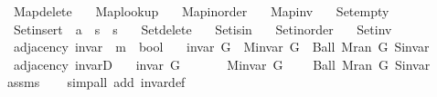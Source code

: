 \begin{isabellebody}
\ \ Map{\isacharunderscore}{\kern0pt}delete\ \isanewline
\ \ Map{\isacharunderscore}{\kern0pt}lookup\ \isanewline
\ \ Map{\isacharunderscore}{\kern0pt}inorder\ \isanewline
\ \ Map{\isacharunderscore}{\kern0pt}inv\ \isanewline
\ \ Set{\isacharunderscore}{\kern0pt}empty\ \isanewline
\ \ Set{\isacharunderscore}{\kern0pt}insert\ {\isacharcolon}{\kern0pt}{\isacharcolon}{\kern0pt}\ {\isachardoublequoteopen}{\isacharprime}{\kern0pt}a\ {\isasymRightarrow}\ {\isacharprime}{\kern0pt}s\ {\isasymRightarrow}\ {\isacharprime}{\kern0pt}s{\isachardoublequoteclose}\ \isanewline
\ \ Set{\isacharunderscore}{\kern0pt}delete\ \isanewline
\ \ Set{\isacharunderscore}{\kern0pt}isin\ \isanewline
\ \ Set{\isacharunderscore}{\kern0pt}inorder\ \isanewline
\ \ Set{\isacharunderscore}{\kern0pt}inv\isanewline
\isanewline
{}\isamarkupfalse%
\ {\isacharparenleft}{\kern0pt}\ adjacency{\isacharparenright}{\kern0pt}\ invar\ {\isacharcolon}{\kern0pt}{\isacharcolon}{\kern0pt}\ {\isachardoublequoteopen}{\isacharprime}{\kern0pt}m\ {\isasymRightarrow}\ bool{\isachardoublequoteclose}\ \isanewline
\ \ {\isachardoublequoteopen}invar\ G\ {\isasymequiv}\ M{\isachardot}{\kern0pt}invar\ G\ {\isasymand}\ Ball\ {\isacharparenleft}{\kern0pt}M{\isachardot}{\kern0pt}ran\ G{\isacharparenright}{\kern0pt}\ S{\isachardot}{\kern0pt}invar{\isachardoublequoteclose}\isanewline
%
\isadeliminvisible
\isanewline
%
\endisadeliminvisible
%
\isataginvisible
{}\isamarkupfalse%
\ {\isacharparenleft}{\kern0pt}\ adjacency{\isacharparenright}{\kern0pt}\ invarD{\isacharcolon}{\kern0pt}\isanewline
\ \ \ {\isachardoublequoteopen}invar\ G{\isachardoublequoteclose}\isanewline
\ \ \isanewline
\ \ \ \ {\isachardoublequoteopen}M{\isachardot}{\kern0pt}invar\ G{\isachardoublequoteclose}\isanewline
\ \ \ \ {\isachardoublequoteopen}Ball\ {\isacharparenleft}{\kern0pt}M{\isachardot}{\kern0pt}ran\ G{\isacharparenright}{\kern0pt}\ S{\isachardot}{\kern0pt}invar{\isachardoublequoteclose}%
\endisataginvisible
{\isafoldinvisible}%
%
\isadeliminvisible
\isanewline
%
\endisadeliminvisible
%
\isadelimproof
\ \ %
\endisadelimproof
%
\isatagproof
{}\isamarkupfalse%
\ assms\isanewline
\ \ \isamarkupfalse%
\ {\isacharparenleft}{\kern0pt}simp{\isacharunderscore}{\kern0pt}all\ add{\isacharcolon}{\kern0pt}\ invar{\isacharunderscore}{\kern0pt}def{\isacharparenright}{\kern0pt}%

\end{isabellebody}
